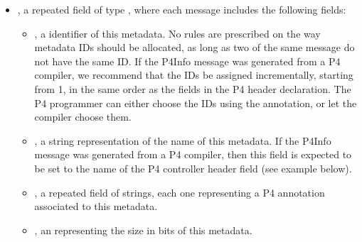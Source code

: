 \documentclass[11pt]{article}
\begin{document}
{\begin{itemize}
\item{}
, a repeated field of type , where each  message
includes the following fields:%

\begin{itemize}[noitemsep,topsep=\mdcompacttopsep]%

\item{}, a  identifier of this metadata. No rules are prescribed on
the way metadata IDs should be allocated, as long as two  of the
same  message do not have the same ID. If the
P4Info message was generated from a P4 compiler, we recommend that the IDs
be assigned incrementally, starting from 1, in the same order as the
fields in the P4 header declaration. The P4 programmer can either choose
the IDs using the  annotation, or let the compiler choose them.%

\item{}, a string representation of the name of this metadata. If the
P4Info message was generated from a P4 compiler, then this field is
expected to be set to the name of the P4 controller header field (see
example below).%

\item{}, a repeated field of strings, each one representing a P4
annotation associated to this metadata.%

\item{}, an  representing the size in bits of this metadata.%


\end{itemize}
\end{itemize}}
\end{document}

